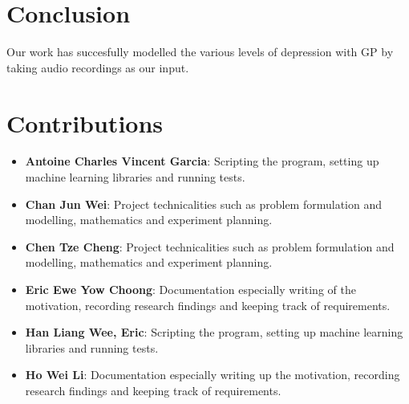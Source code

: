 \documentclass{article}
\begin{document}
	\newpage
	\section{Conclusion}	
	Our work has succesfully modelled the various levels of depression with GP by taking audio recordings as our input. \\
	
	\section{Contributions}
	\begin{itemize}
		\item \textbf{Antoine Charles Vincent Garcia}: 
		Scripting the program, setting up machine learning libraries and running tests.
		\item \textbf{Chan Jun Wei}: 
		Project technicalities such as problem formulation and modelling, mathematics and experiment planning.
		\item \textbf{Chen Tze Cheng}: 
		Project technicalities such as problem formulation and modelling, mathematics and experiment planning.
		\item \textbf{Eric Ewe Yow Choong}: 
		Documentation especially writing of the motivation, recording research findings and keeping track of requirements.
		\item \textbf{Han Liang Wee, Eric}: 
		Scripting the program, setting up machine learning libraries and running tests.
		\item \textbf{Ho Wei Li}: 
		Documentation especially writing up the motivation, recording research findings and keeping track of requirements.
	\end{itemize}
	
	
	
\end{document}
